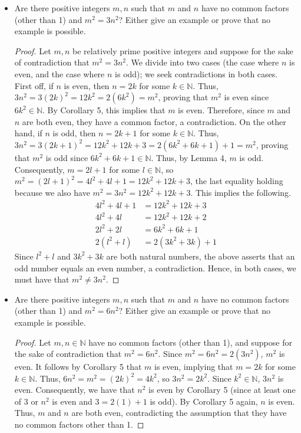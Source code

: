 \documentclass[titlepage]{article}
\newtheorem{corollary}{Corollary}
\theoremstyle{definition}
\newcommand{\N}{\mathbb{N}}
\begin{document}
\begin{itemize}
\begin{corollary}
\begin{proof}
        \end{proof}
    \end{corollary}
    \item Are there positive integers $m,n$ such that $m$ and $n$ have no common factors (other than 1) and $m^2=3n^2$? Either give an example or prove that no example is possible.
    \begin{proof}
        Let $m,n$ be relatively prime positive integers and suppose for the sake of contradiction that $m^2=3n^2$. We divide into two cases (the case where $n$ is even, and the case where $n$ is odd); we seek contradictions in both cases. First off, if $n$ is even, then $n=2k$ for some $k\in\N$. Thus, $3n^2=3(2k)^2=12k^2=2(6k^2)=m^2$, proving that $m^2$ is even since $6k^2\in\N$. By Corollary 5, this implies that $m$ is even. Therefore, since $m$ and $n$ are both even, they have a common factor, a contradiction. On the other hand, if $n$ is odd, then $n=2k+1$ for some $k\in\N$. Thus, $3n^2=3(2k+1)^2=12k^2+12k+3=2(6k^2+6k+1)+1=m^2$, proving that $m^2$ is odd since $6k^2+6k+1\in\N$. Thus, by Lemma 4, $m$ is odd. Consequently, $m=2l+1$ for some $l\in\N$, so $m^2=(2l+1)^2=4l^2+4l+1=12k^2+12k+3$, the last equality holding because we also have $m^2=3n^2=12k^2+12k+3$. This implies the following.
        \begin{align*}
            4l^2+4l+1 &= 12k^2+12k+3\\
            4l^2+4l &= 12k^2+12k+2\\
            2l^2+2l &= 6k^2+6k+1\\
            2(l^2+l) &= 2(3k^2+3k)+1
        \end{align*}
        Since $l^2+l$ and $3k^2+3k$ are both natural numbers, the above asserts that an odd number equals an even number, a contradiction. Hence, in both cases, we must have that $m^2\neq 3n^2$.
    \end{proof}
    \item Are there positive integers $m,n$ such that $m$ and $n$ have no common factors (other than 1) and $m^2=6n^2$? Either give an example or prove that no example is possible.
    \begin{proof}
        Let $m,n\in\N$ have no common factors (other than 1), and suppose for the sake of contradiction that $m^2=6n^2$. Since $m^2=6n^2=2(3n^2)$, $m^2$ is even. It follows by Corollary 5 that $m$ is even, implying that $m=2k$ for some $k\in\N$. Thus, $6n^2=m^2=(2k)^2=4k^2$, so $3n^2=2k^2$. Since $k^2\in\N$, $3n^2$ is even. Consequently, we have that $n^2$ is even by Corollary 5 (since at least one of 3 or $n^2$ is even and $3=2(1)+1$ is odd). By Corollary 5 again, $n$ is even. Thus, $m$ and $n$ are both even, contradicting the assumption that they have no common factors other than 1.

\end{proof}
\end{itemize}
\end{document}
